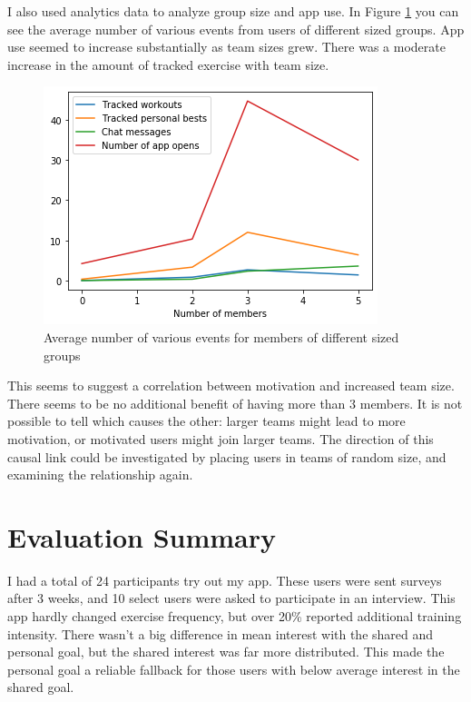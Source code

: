 \documentclass{l4proj}
\begin{document}
I also used analytics data to analyze group size and app use. In Figure \ref{fig:exercises} you can see the average number of various events from users of different sized groups. App use seemed to increase substantially as team sizes grew. There was a moderate increase in the amount of tracked exercise with team size.
\begin{figure}[H]
    \centering
    \includegraphics[width=1.0\linewidth]{data/activity.png}    
    \caption{Average number of various events for members of different sized groups}
    \label{fig:exercises} 
\end{figure}

This seems to suggest a correlation between motivation and increased team size. There seems to be no additional benefit of having more than 3 members. It is not possible to tell which causes the other: larger teams might lead to more motivation, or motivated users might join larger teams. The direction of this causal link could be investigated by placing users in teams of random size, and examining the relationship again.


\section{Evaluation Summary}
I had a total of 24 participants try out my app. These users were sent surveys after 3 weeks, and 10 select users were asked to participate in an interview. This app hardly changed exercise frequency, but over 20\% reported additional training intensity. There wasn't a big difference in mean interest with the shared and personal goal, but the shared interest was far more distributed. This made the personal goal a reliable fallback for those users with below average interest in the shared goal. 
\end{document}
